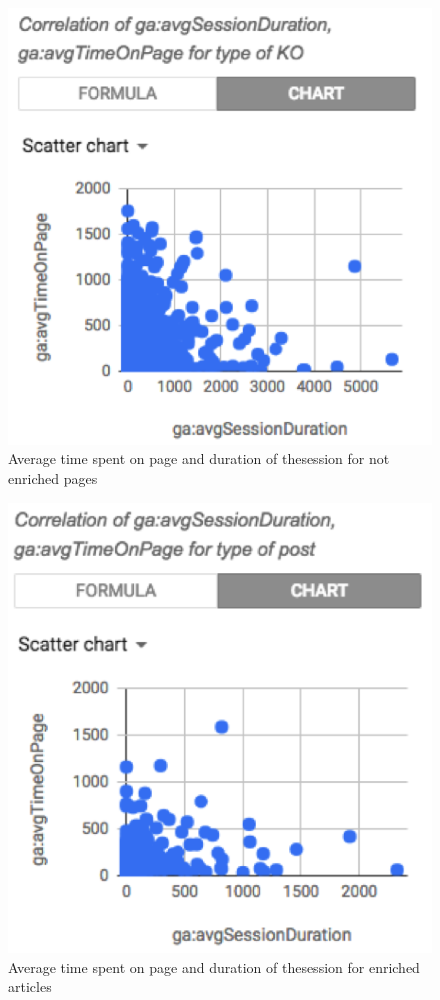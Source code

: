 \documentclass[runningheads,a4paper]{llncs}
\makeatletter
\def\maxwidth#1{\ifdim\Gin@nat@width>#1 #1\else\Gin@nat@width\fi}
\makeatother
\begin{document}
\begin{figure}[h!]
\centering
\includegraphics[width=\maxwidth{\textwidth}]{img/10000201000001CE000001DC932B7000.png}
\cprotect\caption{Average time spent on page and duration of thesession for not enriched pages}
\label{}
\end{figure}

\begin{figure}[h!]
\centering
\includegraphics[width=\maxwidth{\textwidth}]{img/10000201000001C0000001DCDDE60450.png}
\cprotect\caption{Average time spent on page and duration of thesession for enriched articles}
\label{}
\end{figure}
\end{document}
